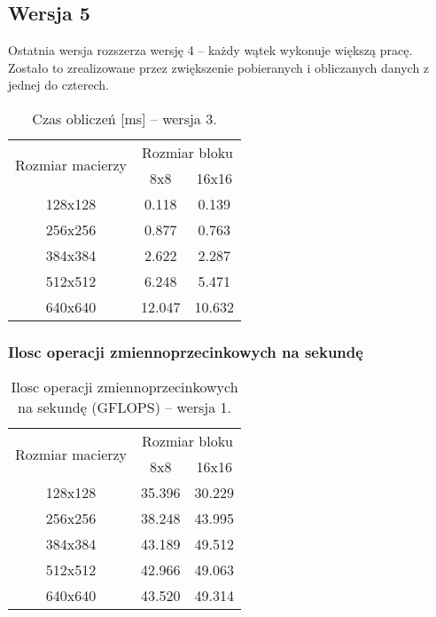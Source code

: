 
\subsection{Wersja 5}

Ostatnia wersja rozszerza wersję 4 -- każdy wątek wykonuje większą pracę. Zostało to zrealizowane przez zwiększenie pobieranych i obliczanych danych z jednej do czterech.



\begin{table}[H]
\centering
\begin{tabular}{|c|c|c|}
\hline
\multirow{2}{*}{Rozmiar macierzy} & \multicolumn{2}{c|}{Rozmiar bloku} \\ \cline{2-3}
& 8x8 & 16x16 \\ \hline
128x128 & 0.118 & 0.139 \\ \hline
256x256 & 0.877 & 0.763 \\ \hline
384x384 & 2.622 & 2.287 \\ \hline
512x512 & 6.248 & 5.471 \\ \hline
640x640 & 12.047 & 10.632 \\ \hline
\end{tabular}
\caption{Czas obliczeń [ms] -- wersja 3.}
\end{table}

\subsubsection{Ilosc operacji zmiennoprzecinkowych na sekundę}

\begin{table}[H]
\centering
\begin{tabular}{|c|c|c|}
\hline
\multirow{2}{*}{Rozmiar macierzy} & \multicolumn{2}{c|}{Rozmiar bloku} \\ \cline{2-3}
& 8x8 & 16x16 \\ \hline
128x128 & 35.396 & 30.229 \\ \hline
256x256 & 38.248 & 43.995 \\ \hline
384x384 & 43.189 & 49.512 \\ \hline
512x512 & 42.966 & 49.063 \\ \hline
640x640 & 43.520 & 49.314 \\ \hline
\end{tabular}
\caption{Ilosc operacji zmiennoprzecinkowych na sekundę (GFLOPS) -- wersja 1.}
\end{table}

